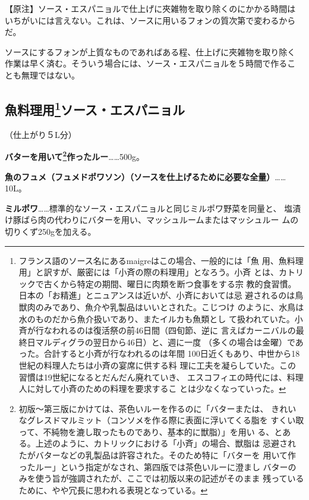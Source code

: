 \documentclass[twoside,12Q,b5paper]{escoffierltjsbook}
\begin{document}
【原注】ソース・エスパニョルで仕上げに夾雑物を取り除くのにかかる時間は
いちがいには言えない。これは、ソースに用いるフォンの質次第で変わるから
だ。

ソースにするフォンが上質なものであればある程、仕上げに夾雑物を取り除く
作業は早く済む。そういう場合には、ソース・エスパニョルを５時間で作るこ
とも無理ではない。

\subsection[魚料理用ソース・エスパニョル]{\texorpdfstring{魚料理用\footnote{フランス語のソース名にあるmaigreはこの場合、一般的には「魚
  用、魚料理用」と訳すが、厳密には「小斉の際の料理用」となろう。小斉
  とは、カトリックで古くから特定の期間、曜日に肉類を断つ食事をする宗
  教的食習慣。日本の「お精進」とニュアンスは近いが、小斉においては忌
  避されるのは鳥獣肉のみであり、魚介や乳製品はいいとされた。こじつけ
  のように、水鳥は水のものだから魚介扱いであり、またイルカも魚類とし
  て扱われていた。小斉が行なわれるのは復活祭の前46日間（四旬節、逆に
  言えばカーニバルの最終日マルディグラの翌日から46日）と、週に一度
  （多くの場合は金曜）であった。合計すると小斉が行なわれるのは年間
  100日近くもあり、中世から18世紀の料理人たちは小斉の宴席に供する料
  理に工夫を凝らしていた。この習慣は19世紀になるとだんだん廃れていき、
  エスコフィエの時代には、料理人に対して小斉のための料理を要求するこ
  とは少なくなっていった。}ソース・エスパニョル}{魚料理用ソース・エスパニョル}}\label{ux9b5aux6599ux7406ux75280102006ux30bdux30fcux30b9ux30a8ux30b9ux30d1ux30cbux30e7ux30eb}

（仕上がり５L分）

\textbf{バターを用いて\footnote{初版〜第三版にかけては、茶色いルーを作るのに「バターまたは、
  きれいなグレスドマルミット（コンソメを作る際に表面に浮いてくる脂を
  すくい取って、不純物を漉し取ったものであり、基本的に獣脂）」を用い
  る、とある。上述のように、カトリックにおける「小斉」の場合、獣脂は
  忌避されたがバターなどの乳製品は許容された。そのため特に「バターを
  用いて作ったルー」という指定がなされ、第四版では茶色いルーに澄まし
  バターのみを使う旨が強調されたが、ここでは初版以来の記述がそのまま
  残っているために、やや冗長に思われる表現となっている。}作ったルー}\ldots{}\ldots{}500g。

\textbf{魚のフュメ（フュメドポワソン）（ソースを仕上げるために必要な全量）}\ldots{}\ldots{}10L。

\textbf{ミルポワ}\ldots{}\ldots{}標準的なソース・エスパニョルと同じミルポワ野菜を同量と、
塩漬け豚ばら肉の代わりにバターを用い、マッシュルームまたはマッシュルー
ムの切りくず250gを加える。
\end{document}
